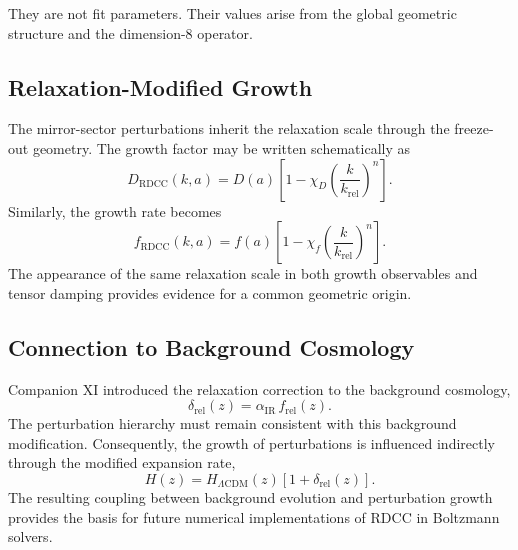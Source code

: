 \documentclass[11pt,a4paper]{article}
\begin{document}
They are not fit parameters. Their values arise from the global geometric
structure and the dimension-8 operator.


\subsection{Relaxation-Modified Growth}

The mirror-sector perturbations inherit the relaxation scale through the
freeze-out geometry. The growth factor may be written schematically as
\begin{equation}
  D_{\mathrm{RDCC}}(k,a)
  =
  D(a)
  \left[
    1
    -
    \chi_D
    \left(
      \frac{k}{k_{\mathrm{rel}}}
    \right)^{n}
  \right].
\end{equation}
Similarly, the growth rate becomes
\begin{equation}
  f_{\mathrm{RDCC}}(k,a)
  =
  f(a)
  \left[
    1
    -
    \chi_f
    \left(
      \frac{k}{k_{\mathrm{rel}}}
    \right)^{n}
  \right].
\end{equation}
The appearance of the same relaxation scale in both growth observables and
tensor damping provides evidence for a common geometric origin.


\subsection{Connection to Background Cosmology}

Companion XI introduced the relaxation correction to the background cosmology,
\begin{equation}
  \delta_{\mathrm{rel}}(z)
  =
  \alpha_{\mathrm{IR}}\, f_{\mathrm{rel}}(z).
\end{equation}
The perturbation hierarchy must remain consistent with this background
modification. Consequently, the growth of perturbations is influenced
indirectly through the modified expansion rate,
\begin{equation}
  H(z)
  =
  H_{\Lambda\mathrm{CDM}}(z)
  \left[
    1 + \delta_{\mathrm{rel}}(z)
  \right].
\end{equation}
The resulting coupling between background evolution and perturbation growth
provides the basis for future numerical implementations of RDCC in Boltzmann
solvers.
\end{document}
